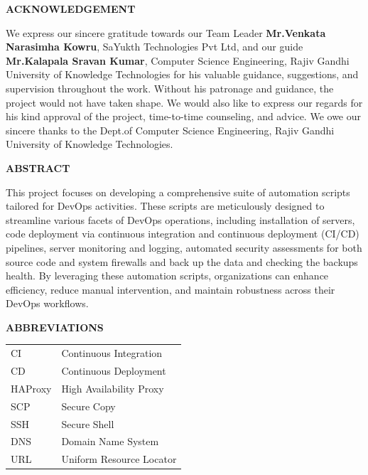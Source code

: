 \documentclass[12pt,a4paper,oneside]{report}
\begin{document}
\thispagestyle{empty}
\vspace*{3cm}
\begin{center}  {\large \bf ACKNOWLEDGEMENT}\end{center}
\vspace{1cm}
\hspace{1cm}We express our sincere gratitude towards our Team Leader \textbf{Mr.Venkata Narasimha Kowru}, SaYukth Technologies Pvt Ltd, and our guide \textbf{Mr.Kalapala Sravan Kumar},
Computer Science Engineering, Rajiv Gandhi University of Knowledge Technologies for his valuable guidance, suggestions, and supervision throughout the work. Without his patronage and guidance, the project would not have taken shape. We would also like to express our regards for his kind approval of the project, time-to-time counseling, and advice. We owe our sincere thanks to the Dept.of Computer Science Engineering, Rajiv Gandhi University of Knowledge Technologies. 
\newpage
\vspace*{2cm}
\begin{center}  {\Large \bf ABSTRACT}\end{center}
\vspace{1cm}
\noindent 
\hspace{1cm}
This project focuses on developing a comprehensive suite of automation scripts tailored for DevOps activities. These scripts are meticulously designed to streamline various facets of DevOps operations, including installation of servers, code deployment via continuous integration and continuous deployment (CI/CD) pipelines, server monitoring and logging, automated security assessments for both source code and system firewalls and back up the data and checking the backups health. By leveraging these automation scripts, organizations can enhance efficiency, reduce manual intervention, and maintain robustness across their DevOps workflows.


\newpage
\thispagestyle{empty}

\newpage
\tableofcontents 	
\cleardoublepage 

\listoffigures 	\cleardoublepage

\newpage
\begin{center}  {\Large \bf ABBREVIATIONS}\end{center}
\vspace{1cm}\doublespacing
\begin{tabular}{l l}

CI & Continuous Integration \\
CD & Continuous Deployment  \\
HAProxy & High Availability Proxy \\
SCP & Secure Copy \\
SSH & Secure Shell \\
DNS & Domain Name System \\
URL & Uniform Resource Locator\\



\end{tabular} 
\end{document}
